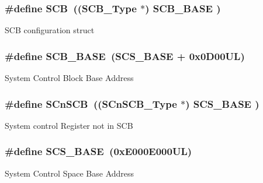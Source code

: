 \subsubsection[{\texorpdfstring{S\+CB}{SCB}}]{\setlength{\rightskip}{0pt plus 5cm}\#define S\+CB~(({\bf S\+C\+B\+\_\+\+Type}       $\ast$)     {\bf S\+C\+B\+\_\+\+B\+A\+SE}      )}\hypertarget{group___c_m_s_i_s__core__base_gaaaf6477c2bde2f00f99e3c2fd1060b01}{}\label{group___c_m_s_i_s__core__base_gaaaf6477c2bde2f00f99e3c2fd1060b01}
S\+CB configuration struct 
\subsubsection[{\texorpdfstring{S\+C\+B\+\_\+\+B\+A\+SE}{SCB_BASE}}]{\setlength{\rightskip}{0pt plus 5cm}\#define S\+C\+B\+\_\+\+B\+A\+SE~({\bf S\+C\+S\+\_\+\+B\+A\+SE} +  0x0\+D00\+U\+L)}\hypertarget{group___c_m_s_i_s__core__base_gad55a7ddb8d4b2398b0c1cfec76c0d9fd}{}\label{group___c_m_s_i_s__core__base_gad55a7ddb8d4b2398b0c1cfec76c0d9fd}
System Control Block Base Address 
\subsubsection[{\texorpdfstring{S\+Cn\+S\+CB}{SCnSCB}}]{\setlength{\rightskip}{0pt plus 5cm}\#define S\+Cn\+S\+CB~(({\bf S\+Cn\+S\+C\+B\+\_\+\+Type}    $\ast$)     {\bf S\+C\+S\+\_\+\+B\+A\+SE}      )}\hypertarget{group___c_m_s_i_s__core__base_ga9fe0cd2eef83a8adad94490d9ecca63f}{}\label{group___c_m_s_i_s__core__base_ga9fe0cd2eef83a8adad94490d9ecca63f}
System control Register not in S\+CB 
\subsubsection[{\texorpdfstring{S\+C\+S\+\_\+\+B\+A\+SE}{SCS_BASE}}]{\setlength{\rightskip}{0pt plus 5cm}\#define S\+C\+S\+\_\+\+B\+A\+SE~(0x\+E000\+E000\+U\+L)}\hypertarget{group___c_m_s_i_s__core__base_ga3c14ed93192c8d9143322bbf77ebf770}{}\label{group___c_m_s_i_s__core__base_ga3c14ed93192c8d9143322bbf77ebf770}
System Control Space Base Address 
